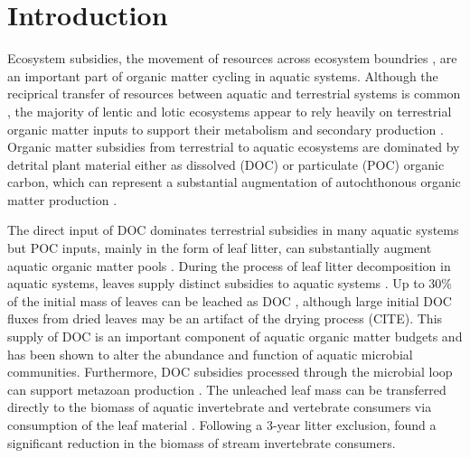 \section{Introduction}
Ecosystem subsidies, the movement of resources across ecosystem boundries \cite{Polis_1997}, are an important part of organic matter cycling in aquatic systems. Although the reciprical transfer of resources between aquatic and terrestrial systems is common \cite{Nakano_2001}, the majority of lentic and lotic ecosystems appear to rely heavily on terrestrial organic matter inputs to support their metabolism and secondary production \cite{Marcarelli_2011}. Organic matter subsidies from terrestrial to aquatic ecosystems are dominated by detrital plant material either as dissolved (DOC) or particulate (POC) organic carbon, which can represent a substantial augmentation of autochthonous organic matter production \cite{Hodkinson_1975,GASITH_1976,wetzel_1984,WETZEL_1995,Webster_1997,Kobayashi_2011,Mehring_2014}.   

The direct input of DOC dominates terrestrial subsidies in many aquatic systems \cite{Rich_1978,wetzel_1984,CITE} but POC inputs, mainly in the form of leaf litter, can substantially augment aquatic organic matter pools \cite{Wetzel_1972,Hodkinson_1975,GASITH_1976,Rich_1978,Wallace_1999,Mehring_2014}. During the process of leaf litter decomposition in aquatic systems, leaves supply distinct subsidies to aquatic systems \cite{Gessner_1999,Marcarelli_2011}. Up to 30\% of the initial mass of leaves can be leached as DOC \cite{CITE,Meyer_1998,Duan_2014}, although large initial DOC fluxes from dried leaves may be an artifact of the drying process (CITE). This supply of DOC is an important component of aquatic organic matter budgets \cite{McDowell_1976,Karlsson_2007} and has been shown to alter the abundance \cite{Bott_1984,Fey_2015} and function \cite{MCCONNELL_1968,Bernhardt_2002} of aquatic microbial communities. Furthermore, DOC subsidies processed through the microbial loop can support metazoan production \cite{Hall_1998,Wilcox_2005,Fey_2015b}.  The unleached leaf mass can be transferred directly to the biomass of aquatic invertebrate \cite{Kobayashi} and vertebrate \cite{Rubbo_2008} consumers via consumption of the leaf material \cite{Gessner_1999}. Following a 3-year litter exclusion, \cite{Wallace_1999} found a significant reduction in the biomass of stream invertebrate consumers. 

